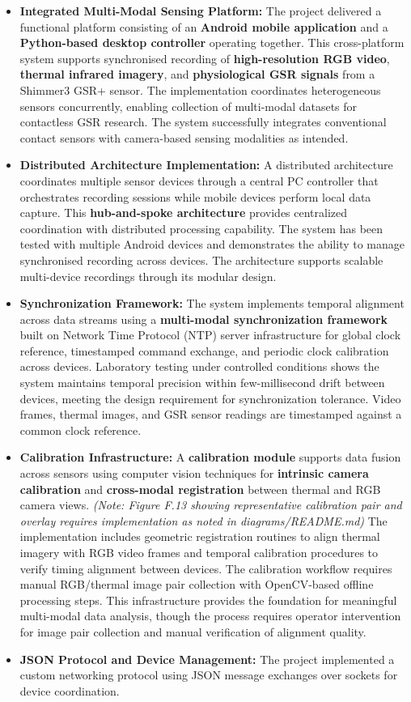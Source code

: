 \documentclass[12pt,a4paper]{article}
\begin{document}
\begin{itemize}
\item
  \textbf{Integrated Multi-Modal Sensing Platform:} The project delivered a functional platform consisting of an \textbf{Android mobile application} and a \textbf{Python-based desktop controller} operating together. This cross-platform system supports synchronised recording of \textbf{high-resolution RGB video}, \textbf{thermal infrared imagery}, and \textbf{physiological GSR signals} from a Shimmer3 GSR+ sensor. The implementation coordinates heterogeneous sensors concurrently, enabling collection of multi-modal datasets for contactless GSR research. The system successfully integrates conventional contact sensors with camera-based sensing modalities as intended.
\item
  \textbf{Distributed Architecture Implementation:} A distributed architecture coordinates multiple sensor devices through a central PC controller that orchestrates recording sessions while mobile devices perform local data capture. This \textbf{hub-and-spoke architecture} provides centralized coordination with distributed processing capability. The system has been tested with multiple Android devices and demonstrates the ability to manage synchronised recording across devices. The architecture supports scalable multi-device recordings through its modular design.
\item
  \textbf{Synchronization Framework:} The system implements temporal alignment across data streams using a \textbf{multi-modal synchronization framework} built on Network Time Protocol (NTP) server infrastructure for global clock reference, timestamped command exchange, and periodic clock calibration across devices. Laboratory testing under controlled conditions shows the system maintains temporal precision within few-millisecond drift between devices, meeting the design requirement for synchronization tolerance. Video frames, thermal images, and GSR sensor readings are timestamped against a common clock reference.
\item
  \textbf{Calibration Infrastructure:} A \textbf{calibration module} supports data fusion across sensors using computer vision techniques for \textbf{intrinsic camera calibration} and \textbf{cross-modal registration} between thermal and RGB camera views. \emph{(Note: Figure F.13 showing representative calibration pair and overlay requires implementation as noted in diagrams/README.md)} The implementation includes geometric registration routines to align thermal imagery with RGB video frames and temporal calibration procedures to verify timing alignment between devices. The calibration workflow requires manual RGB/thermal image pair collection with OpenCV-based offline processing steps. This infrastructure provides the foundation for meaningful multi-modal data analysis, though the process requires operator intervention for image pair collection and manual verification of alignment quality.
\item
  \textbf{JSON Protocol and Device Management:} The project implemented a custom networking protocol using JSON message exchanges over sockets for device coordination.
\end{itemize}
\end{document}
